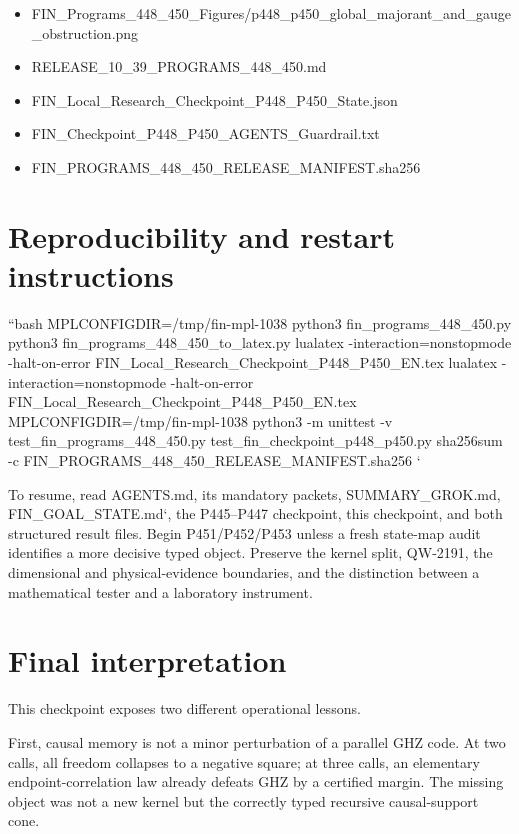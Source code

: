 \documentclass[11pt,a4paper,openany]{report}
\begin{document}
\begin{itemize}
\item 
FIN\_Programs\_448\_450\_Figures/\allowbreak{}p448\_p450\_global\_majorant\_and\_gauge\_obstruction.png

\item 
RELEASE\_10\_39\_PROGRAMS\_448\_450.md

\item 
FIN\_Local\_Research\_Checkpoint\_P448\_P450\_State.json

\item 
FIN\_Checkpoint\_P448\_P450\_AGENTS\_Guardrail.txt

\item 
FIN\_PROGRAMS\_448\_450\_RELEASE\_MANIFEST.sha256

\end{itemize}

\chapter{Reproducibility and restart instructions}

``bash MPLCONFIGDIR=/\allowbreak{}tmp/\allowbreak{}fin-mpl-1038 python3 fin\_programs\_448\_450.py python3 fin\_programs\_448\_450\_to\_latex.py lualatex -interaction=nonstopmode -halt-on-error FIN\_Local\_Research\_Checkpoint\_P448\_P450\_EN.tex lualatex -interaction=nonstopmode -halt-on-error FIN\_Local\_Research\_Checkpoint\_P448\_P450\_EN.tex MPLCONFIGDIR=/\allowbreak{}tmp/\allowbreak{}fin-mpl-1038 python3 -m unittest -v test\_fin\_programs\_448\_450.py test\_fin\_checkpoint\_p448\_p450.py sha256sum -c FIN\_PROGRAMS\_448\_450\_RELEASE\_MANIFEST.sha256 `

To resume, read AGENTS.md, its mandatory packets, SUMMARY\_GROK.md, FIN\_GOAL\_STATE.md`, the P445--P447 checkpoint, this checkpoint, and both structured result files. Begin P451/\allowbreak{}P452/\allowbreak{}P453 unless a fresh state-map audit identifies a more decisive typed object. Preserve the kernel split, QW-2191, the dimensional and physical-evidence boundaries, and the distinction between a mathematical tester and a laboratory instrument.

\chapter{Final interpretation}

This checkpoint exposes two different operational lessons.

First, causal memory is not a minor perturbation of a parallel GHZ code. At two calls, all freedom collapses to a negative square; at three calls, an elementary endpoint-correlation law already defeats GHZ by a certified margin. The missing object was not a new kernel but the correctly typed recursive causal-support cone.
\end{document}
